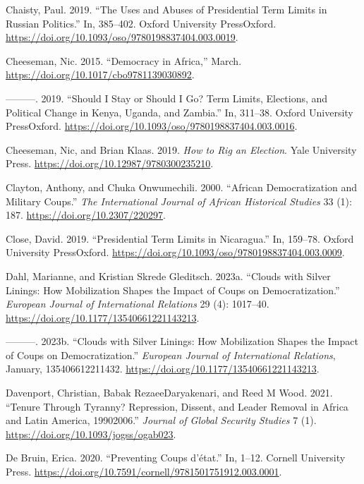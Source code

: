 \documentclass[
  12pt,
]{report}
\newlength{\cslhangindent}
\newenvironment{CSLReferences}[2] %
 {\begin{list}{}{%
  \setlength{\itemindent}{0pt}
  \setlength{\leftmargin}{0pt}
  \setlength{\parsep}{0pt}
  \ifodd #1
   \setlength{\leftmargin}{\cslhangindent}
   \setlength{\itemindent}{-1\cslhangindent}
  \fi
  \setlength{\itemsep}{#2\baselineskip}}}
 {\end{list}}
\begin{document}
\begin{CSLReferences}{1}{0}
Chaisty, Paul. 2019. {``The Uses and Abuses of Presidential Term Limits
in Russian Politics.''} In, 385--402. Oxford University PressOxford.
\url{https://doi.org/10.1093/oso/9780198837404.003.0019}.

Cheeseman, Nic. 2015. {``Democracy in Africa,''} March.
\url{https://doi.org/10.1017/cbo9781139030892}.

---------. 2019. {``Should I Stay or Should I Go? Term Limits,
Elections, and Political Change in Kenya, Uganda, and Zambia.''} In,
311--38. Oxford University PressOxford.
\url{https://doi.org/10.1093/oso/9780198837404.003.0016}.

Cheeseman, Nic, and Brian Klaas. 2019. \emph{How to Rig an Election}.
Yale University Press. \url{https://doi.org/10.12987/9780300235210}.

Clayton, Anthony, and Chuka Onwumechili. 2000. {``African
Democratization and Military Coups.''} \emph{The International Journal
of African Historical Studies} 33 (1): 187.
\url{https://doi.org/10.2307/220297}.

Close, David. 2019. {``Presidential Term Limits in Nicaragua.''} In,
159--78. Oxford University PressOxford.
\url{https://doi.org/10.1093/oso/9780198837404.003.0009}.

Dahl, Marianne, and Kristian Skrede Gleditsch. 2023a. {``Clouds with
Silver Linings: How Mobilization Shapes the Impact of Coups on
Democratization.''} \emph{European Journal of International Relations}
29 (4): 1017--40. \url{https://doi.org/10.1177/13540661221143213}.

---------. 2023b. {``Clouds with Silver Linings: How Mobilization Shapes
the Impact of Coups on Democratization.''} \emph{European Journal of
International Relations}, January, 135406612211432.
\url{https://doi.org/10.1177/13540661221143213}.

Davenport, Christian, Babak RezaeeDaryakenari, and Reed M Wood. 2021.
{``Tenure Through Tyranny? Repression, Dissent, and Leader Removal in
Africa and Latin America, 1990{\textendash}2006.''} \emph{Journal of
Global Security Studies} 7 (1).
\url{https://doi.org/10.1093/jogss/ogab023}.

De Bruin, Erica. 2020. {``Preventing Coups d{'}état.''} In, 1--12.
Cornell University Press.
\url{https://doi.org/10.7591/cornell/9781501751912.003.0001}.


\end{CSLReferences}
\end{document}
